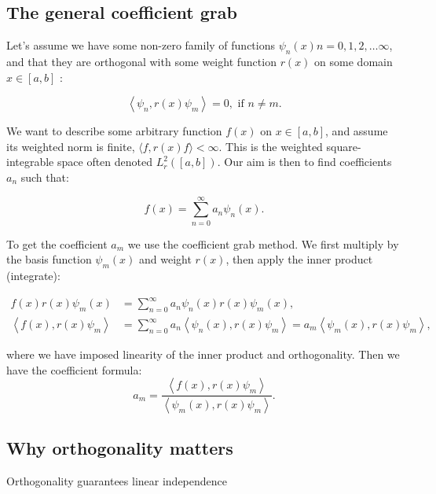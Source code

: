 \subsection{The general coefficient grab}

\begin{method}
  Let's assume we have some non-zero family of functions \(\psi_n(x) n=0,1,2, \ldots \infty\), and that they are orthogonal with some weight function \(r(x)\) on some domain \(x \in[a, b]\) :

\[
\left\langle\psi_n, r(x) \psi_m\right\rangle=0, \text { if } n \neq m .
\]

We want to describe some arbitrary function \(f(x)\) on \(x \in[a, b]\), and assume its weighted norm is finite, \(\langle f, r(x) f\rangle<\infty\). This is the weighted square-integrable space often denoted \(L_r^2([a, b])\). Our aim is then to find coefficients \(a_n\) such that:

\[
f(x)=\sum_{n=0}^{\infty} a_n \psi_n(x) .
\]

To get the coefficient \(a_m\) we use the coefficient grab method. We first multiply by the basis function \(\psi_m(x)\) and weight \(r(x)\), then apply the inner product (integrate):

\[
\begin{aligned}
f(x) r(x) \psi_m(x) & =\sum_{n=0}^{\infty} a_n \psi_n(x) r(x) \psi_m(x), \\
\left\langle f(x), r(x) \psi_m\right\rangle & =\sum_{n=0}^{\infty} a_n\left\langle\psi_n(x), r(x) \psi_m\right\rangle=a_m\left\langle\psi_m(x), r(x) \psi_m\right\rangle,
\end{aligned}
\]

where we have imposed linearity of the inner product and orthogonality. Then we have the coefficient formula:
\[a_m=\frac{\left\langle f(x), r(x) \psi_m\right\rangle}{\left\langle\psi_m(x), r(x) \psi_m\right\rangle} .\]

\end{method}

\subsection{Why orthogonality matters}

\begin{lemma}
Orthogonality guarantees linear independence
\end{lemma}

\begin{proofidea}
  
  
\end{proofidea}
  

